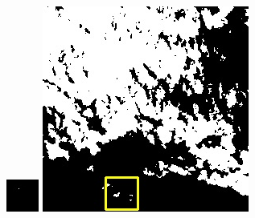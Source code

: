 \documentclass[10pt]{ctexart}
\begin{document}
\begin{multicols}{2}
\begin{figure}[H]
{\begin{minipage}[b]{0.15\linewidth}
            \includegraphics[width=1\linewidth]{../log/spoon2/cut2/tmp_cut_LC80460282014171LGN00_12434_mask.jpg}\vspace{4pt}
            \includegraphics[width=1\linewidth]{../log/spoon2/cut2/LC81620432014072LGN00_16237_mask.jpg}\vspace{4pt}

\end{minipage}}
\end{figure}
\end{multicols}
\end{document}
